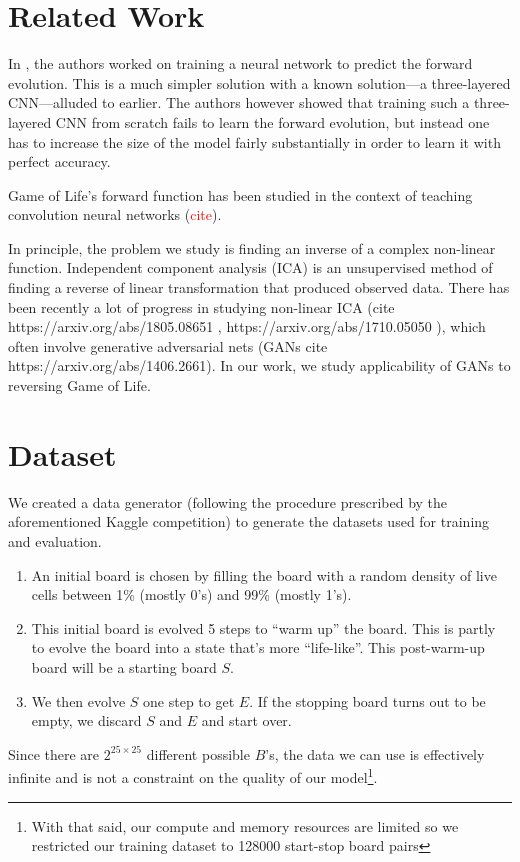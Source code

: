 \documentclass[conference]{IEEEtran}
\newcommand\todo[1]{\textcolor{red}{#1}}
\begin{document}
\section{Related Work}
In \cite{b5}, the authors worked on training a neural network to predict the forward evolution. This is a much simpler solution with a known solution---a three-layered CNN---alluded to earlier. The authors however showed that training such a three-layered CNN from scratch fails to learn the forward evolution, but instead one has to increase the size of the model fairly substantially in order to learn it with perfect accuracy.

Game of Life's forward function has been studied in the context of teaching convolution neural networks (\todo{cite}).

In principle, the problem we study is finding an inverse of a complex non-linear function.  Independent component analysis (ICA)  is an unsupervised method of finding a reverse of linear transformation that produced observed data. There has been recently a lot of progress in studying non-linear ICA (cite https://arxiv.org/abs/1805.08651 , https://arxiv.org/abs/1710.05050 ), which often involve generative adversarial nets (GANs cite https://arxiv.org/abs/1406.2661). In our work, we study applicability of GANs to reversing Game of Life.

\section{Dataset}

We created a data generator (following the procedure prescribed by the aforementioned Kaggle competition) to generate the datasets used for training and evaluation.

\begin{enumerate}
\item An initial board is chosen by filling the board with a random density of live cells between 1\% (mostly 0's) and 99\% (mostly 1's).
\item This initial board is evolved 5 steps to ``warm up'' the board. This is partly to evolve the board into a state that's more ``life-like''. This post-warm-up board will be a starting board $S$.
\item We then evolve $S$ one step to get $E$. If the stopping board turns out to be empty, we discard $S$ and $E$ and start over.
\end{enumerate}

Since there are $2^{25 \times 25}$ different possible $B$'s, the data we can use is effectively infinite and is not a constraint on the quality of our model\footnote{With that said, our compute and memory resources are limited so we restricted our training dataset to 128000 start-stop board pairs}. 
\end{document}
